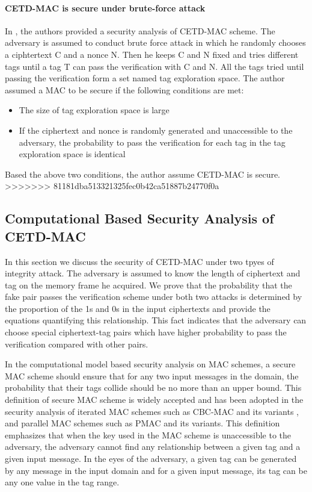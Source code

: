 \paragraph{CETD-MAC is secure under brute-force attack}
In \cite{}, the authors provided a security analysis of CETD-MAC scheme. The adversary is assumed to conduct brute force attack in which he randomly chooses a ciphtertext C and a nonce N. Then he keeps C and N fixed and tries different tags until a tag T can pass the verification with C and N. All the tags tried until passing the verification form a set named tag exploration space. The author assumed a MAC to be secure if the following conditions are met:
\begin{itemize}
	\item The size of tag exploration space is large
	\item If the ciphertext and nonce is randomly generated and unaccessible to the adversary, the probability to pass the verification for each tag in the tag exploration space is identical
\end{itemize}
Based the above two conditions, the author assume CETD-MAC is secure.
>>>>>>> 81181dba513321325fec0b42ca51887b24770f0a

\subsection{Computational Based Security Analysis of CETD-MAC}
In this section we discuss the security of CETD-MAC under two tpyes of integrity attack.  The adversary is assumed to know the length of ciphertext and tag on the memory frame he acquired. 
We prove that the probability that the fake pair passes the verification scheme under both two attacks is determined by the proportion of the 1s and 0s in the input ciphertexts and provide the equations quantifying this relationship. This fact indicates that the adversary can choose special ciphertext-tag pairs which have higher probability to pass the verification compared with other pairs.  

In the computational model based security analysis on MAC schemes, a secure MAC scheme should ensure that for any two input messages in the domain, the probability that their tags collide should be no more than an upper bound. This definition of secure MAC scheme is widely accepted and has been adopted in the security analysis of iterated MAC schemes such as CBC-MAC \cite{} and its variants \cite{}, and parallel MAC schemes such as PMAC \cite{} and its variants\cite{}. This definition emphasizes that when the key used in the MAC scheme is unaccessible to the adversary, the adversary cannot find any relationship between a given tag and a given input message. In the eyes of the adversary, a given tag can be generated by any message in the input domain and for a given input message, its tag can be any one value in the tag range. 

